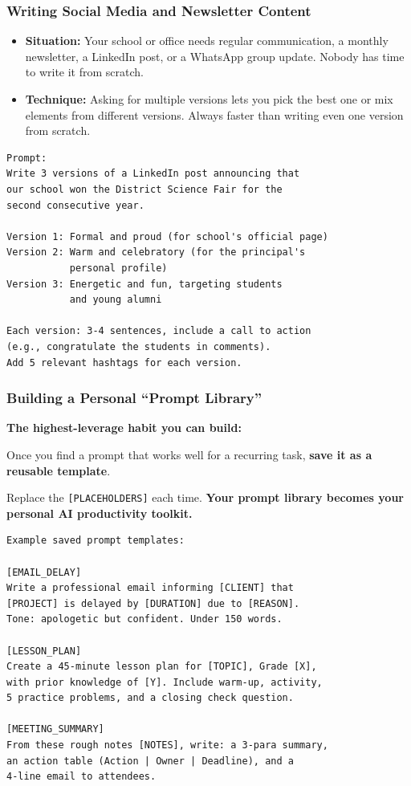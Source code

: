 \begin{frame}[fragile]\frametitle{Writing Social Media and Newsletter Content}

    \begin{itemize}
        \item \textbf{Situation:} Your school or office needs regular communication, a monthly newsletter, a LinkedIn post, or a WhatsApp group update. Nobody has time to write it from scratch.
        \item \textbf{Technique:} Asking for multiple versions lets you pick the best one or mix elements from different versions. Always faster than writing even one version from scratch.
    \end{itemize}
		
\begin{lstlisting}[language=HTML]
Prompt:
Write 3 versions of a LinkedIn post announcing that 
our school won the District Science Fair for the 
second consecutive year.

Version 1: Formal and proud (for school's official page)
Version 2: Warm and celebratory (for the principal's 
           personal profile)
Version 3: Energetic and fun, targeting students 
           and young alumni

Each version: 3-4 sentences, include a call to action 
(e.g., congratulate the students in comments).
Add 5 relevant hashtags for each version.
\end{lstlisting}



\end{frame}


\begin{frame}[fragile]\frametitle{Building a Personal ``Prompt Library''}

\textbf{The highest-leverage habit you can build:}

\medskip
Once you find a prompt that works well for a recurring task, \textbf{save it as a reusable template}.

\medskip
Replace the \texttt{[PLACEHOLDERS]} each time. \textbf{Your prompt library becomes your personal AI productivity toolkit.}

\begin{lstlisting}[language=HTML]
Example saved prompt templates:

[EMAIL_DELAY]
Write a professional email informing [CLIENT] that 
[PROJECT] is delayed by [DURATION] due to [REASON]. 
Tone: apologetic but confident. Under 150 words.

[LESSON_PLAN]  
Create a 45-minute lesson plan for [TOPIC], Grade [X], 
with prior knowledge of [Y]. Include warm-up, activity, 
5 practice problems, and a closing check question.

[MEETING_SUMMARY]
From these rough notes [NOTES], write: a 3-para summary, 
an action table (Action | Owner | Deadline), and a 
4-line email to attendees.
\end{lstlisting}



\end{frame}


